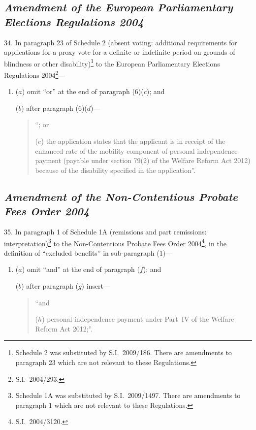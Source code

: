 \documentclass[12pt,a4paper]{article}
\begin{document}
\subsection*{\itshape Amendment of the European Parliamentary Elections Regulations 2004}

34.  In paragraph 23 of Schedule 2 (absent voting: additional requirements for applications for a proxy vote for a definite or indefinite period on grounds of blindness or other disability)\footnote{Schedule 2 was substituted by S.I.~2009/186. There are amendments to paragraph 23 which are not relevant to these Regulations.} to the European Parliamentary Elections Regulations 2004\footnote{S.I.~2004/293.}—
\begin{enumerate}\item[]
($a$) omit “or” at the end of paragraph (6)($c$); and

($b$) after paragraph (6)($d$)—
\begin{quotation}
“; or

($e$) the application states that the applicant is in receipt of the enhanced rate of the mobility component of personal independence payment (payable under section 79(2) of the Welfare Reform Act 2012) because of the disability specified in the application”.
\end{quotation}
\end{enumerate}

\subsection*{\itshape Amendment of the Non-Contentious Probate Fees Order 2004}

35.  In paragraph 1 of Schedule 1A (remissions and part remissions: interpretation)\footnote{Schedule 1A was substituted by S.I.~2009/1497. There are amendments to paragraph 1 which are not relevant to these Regulations.} to the Non-Contentious Probate Fees Order 2004\footnote{S.I.~2004/3120.}, in the definition of “excluded benefits” in sub-paragraph (1)—
\begin{enumerate}\item[]
($a$) omit “and” at the end of paragraph ($f$); and

($b$) after paragraph ($g$)  insert—
\begin{quotation}
“and

($h$) personal independence payment under Part~IV of the Welfare Reform Act 2012;”.
\end{quotation}
\end{enumerate}
\end{document}
